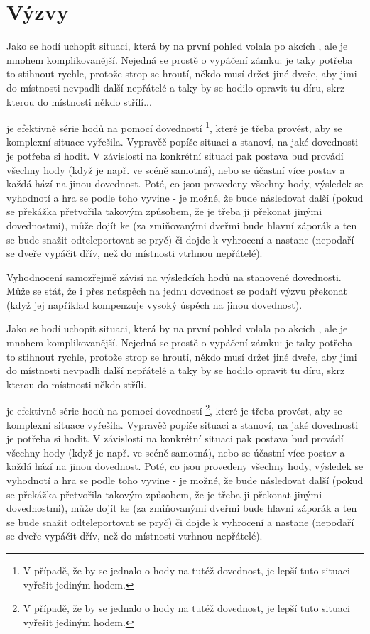 \section{Výzvy}
\label{sec:vyzvy}

Jako  se hodí uchopit situaci, která by na první pohled volala po akcích , ale je mnohem komplikovanější. Nejedná se prostě o vypáčení zámku: je taky potřeba to stihnout rychle, protože strop se hroutí, někdo musí držet jiné dveře, aby jimi do místnosti nevpadli další nepřátelé a taky by se hodilo opravit tu díru, skrz kterou do místnosti někdo střílí...

 je efektivně série hodů na  pomocí  dovedností \footnote{V případě, že by se jednalo o hody na tutéž dovednost, je lepší tuto situaci vyřešit jediným hodem.}, které je třeba provést, aby se komplexní situace vyřešila. Vypravěč popíše situaci a stanoví, na jaké dovednosti je potřeba si hodit. V závislosti na konkrétní situaci pak postava buď provádí všechny hody (když je např. ve scéně samotná), nebo se  účastní více postav a každá hází na jinou dovednost. Poté, co jsou provedeny všechny hody, výsledek  se vyhodnotí a hra se podle toho vyvine - je možné, že bude následovat další  (pokud se překážka přetvořila takovým způsobem, že je třeba ji překonat jinými dovednostmi), může dojít ke  (za zmiňovanými dveřmi bude hlavní záporák a ten se bude snažit odteleportovat se pryč) či dojde k vyhrocení a nastane  (nepodaří se dveře vypáčit dřív, než do místnosti vtrhnou nepřátelé).

Vyhodnocení  samozřejmě závisí na výsledcích hodů na stanovené dovednosti. Může se stát, že i přes neúspěch na jednu dovednost se podaří výzvu překonat (když jej například kompenzuje vysoký úspěch na jinou dovednost).

Jako  se hodí uchopit situaci, která by na první pohled volala po akcích , ale je mnohem komplikovanější. Nejedná se prostě o vypáčení zámku: je taky potřeba to stihnout rychle, protože strop se hroutí, někdo musí držet jiné dveře, aby jimi do místnosti nevpadli další nepřátelé a taky by se hodilo opravit tu díru, skrz kterou do místnosti někdo střílí.

 je efektivně série hodů na  pomocí  dovedností \footnote{V případě, že by se jednalo o hody na tutéž dovednost, je lepší tuto situaci vyřešit jediným hodem.}, které je třeba provést, aby se komplexní situace vyřešila. Vypravěč popíše situaci a stanoví, na jaké dovednosti je potřeba si hodit. V závislosti na konkrétní situaci pak postava buď provádí všechny hody (když je např. ve scéně samotná), nebo se  účastní více postav a každá hází na jinou dovednost. Poté, co jsou provedeny všechny hody, výsledek  se vyhodnotí a hra se podle toho vyvine - je možné, že bude následovat další  (pokud se překážka přetvořila takovým způsobem, že je třeba ji překonat jinými dovednostmi), může dojít ke  (za zmiňovanými dveřmi bude hlavní záporák a ten se bude snažit odteleportovat se pryč) či dojde k vyhrocení a nastane  (nepodaří se dveře vypáčit dřív, než do místnosti vtrhnou nepřátelé).

